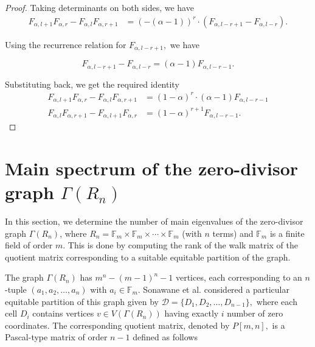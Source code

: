 \documentclass[11pt,oneside]{article}
\theoremstyle{plain}
\theoremstyle{plain}
\theoremstyle{definition}
\numberwithin{figure}{section}
\theoremstyle{remark}
\numberwithin{equation}{section}
\begin{document}
\begin{proof}
		Taking determinants on both sides, we have
		\begin{align*}
			F_{\alpha,l+1}F_{\alpha,r} - F_{\alpha,l}F_{\alpha,r+1}
			&=
			\left(-(\alpha-1) \right)^r
			\cdot
			\left( F_{\alpha,l-r+1} - F_{\alpha,l-r} \right).
		\end{align*}
		
		
		Using the recurrence relation for $F_{\alpha,l-r+1},$ we have
		
		\[
		F_{\alpha,l-r+1} - F_{\alpha,l-r} = (\alpha-1)F_{\alpha,l-r-1}.
		\]
		
		Substituting back, we get the required identity
		\begin{align*}
			F_{\alpha,l+1}F_{\alpha,r} - F_{\alpha,l}F_{\alpha,r+1}
			&= (1-\alpha)^r \cdot (\alpha-1)F_{\alpha,l-r-1}\\
			F_{\alpha,l}F_{\alpha,r+1} - F_{\alpha,l+1}F_{\alpha,r}
			&=  (1-\alpha)^{r+1} F_{\alpha,l-r-1}.
		\end{align*}
		
	\end{proof}
	
	
	\section{Main spectrum of the zero-divisor graph \texorpdfstring{$\Gamma(R_n)$}{Gamma(Rn)}}
	
	\noindent
	In this section, we determine the number of main eigenvalues of the zero-divisor graph \(\Gamma(R_n)\), where 
	\( R_n = \mathbb{F}_m \times \mathbb{F}_m \times \cdots \times \mathbb{F}_m \) (with \(n\) terms) and \( \mathbb{F}_m \) is a finite field of order \(m\). 
	This is done by computing the rank of the walk matrix of the quotient matrix corresponding to a suitable equitable partition of the graph.
	
	
	The graph $\Gamma(R_n)$ has \( m^n-(m-1)^n-1 \) vertices, each corresponding to an \( n \)-tuple \( (a_1,a_2,\dots,a_n) \) with \( a_i\in\mathbb{F}_m \).  Sonawane et al. \cite{sonawane1} considered a particular  equitable partition of this graph  given by $\mathcal{D} = \{D_1, D_2, \dots, D_{n-1}\},$ where each cell $D_i$ contains vertices $v\in V(\Gamma(R_n))$ having exactly $i$  number of zero coordinates. The corresponding quotient matrix, denoted by $P[m,n],$ is a Pascal-type matrix of order $n-1$ defined as follows 
	
\end{document}
